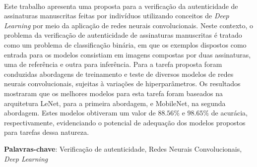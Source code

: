 \ \ \\[2cm]
Este trabalho apresenta uma proposta para a verificação da autenticidade de assinaturas manuscritas feitas por indivíduos utilizando conceitos de \emph{Deep Learning} por meio da aplicação de redes neurais convolucionais. Neste contexto, o problema da verificação de autenticidade de assinaturas manuscritas é tratado como um problema de classificação binária, em que os exemplos dispostos como entrada para os modelos consistiam em imagens compostas por duas assinaturas, uma de referência e outra para inferência. Para a tarefa proposta foram conduzidas abordagens de treinamento e teste de diversos modelos de redes neurais convolucionais, sujeitas à variações de hiperparâmetros. Os resultados mostraram que os melhores modelos para esta tarefa foram baseados na arquitetura LeNet, para a primeira abordagem, e MobileNet, na segunda abordagem. Estes modelos obtiveram um valor de $88.56\%$ e $98.65\%$ de acurácia, respectivamente, evidenciando o potencial de adequação dos modelos propostos para tarefas dessa natureza.

\noindent \textbf{Palavras-chave}: Verificação de autenticidade, Redes Neurais Convolucionais, \emph{Deep Learning}
